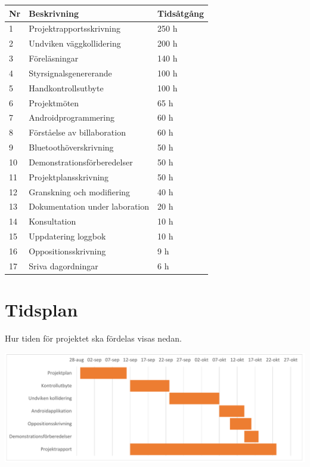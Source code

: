 \documentclass[a4paper]{article}
\begin{document}
\begin{tabular}{|l|l|l|} \hline
\bf Nr & \bf Beskrivning                & \bf Tidsåtgång \\ \hline \hline
1      & Projektrapportsskrivning       & 250 h \\ \hline
2      & Undviken väggkollidering       & 200 h \\ \hline
3      & Föreläsningar                  & 140 h \\ \hline
4      & Styrsignalsgenererande         & 100 h \\ \hline
5      & Handkontrollsutbyte            & 100 h \\ \hline
6      & Projektmöten                   & 65  h \\ \hline
7      & Androidprogrammering           & 60  h \\ \hline 
8      & Förståelse av billaboration    & 60  h \\ \hline
9      & Bluetoothöverskrivning         & 50  h \\ \hline
10     & Demonstrationsförberedelser    & 50  h \\ \hline
11     & Projektplansskrivning          & 50  h \\ \hline
12     & Granskning och modifiering     & 40  h \\ \hline
13     & Dokumentation under laboration & 20  h \\ \hline
14     & Konsultation                   & 10  h \\ \hline 
15     & Uppdatering loggbok            & 10  h \\ \hline
16     & Oppositionsskrivning           & 9   h \\ \hline
17     & Sriva dagordningar             & 6   h \\ \hline
\end{tabular}

\section{Tidsplan}
Hur tiden för projektet ska fördelas visas nedan.

\includegraphics[width=\textwidth]{gantt.pdf}
\end{document}
